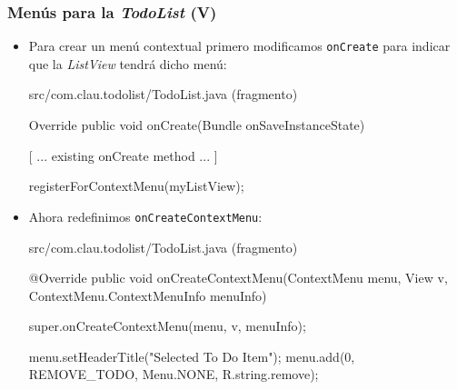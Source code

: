 \documentclass[hyperref={pdfpagelabels=true},ucs]{beamer}
\begin{document}
\begin{frame}[fragile, shrink=5]
\frametitle{Menús para la \emph{TodoList} (V)}

\begin{itemize}
\item Para crear un menú contextual primero modificamos
  \verb|onCreate| para indicar que la \emph{ListView} tendrá dicho menú:

\begin{tiny}
\begin{block}{src/com.clau.todolist/TodoList.java (fragmento)}
\begin{java}
  Override
   public void onCreate(Bundle onSaveInstanceState) {
 
  [ ... existing onCreate method ... ]

   registerForContextMenu(myListView);
}
\end{java}
\end{block}
\end{tiny}

\item Ahora redefinimos \verb|onCreateContextMenu|:

\begin{tiny}
\begin{block}{src/com.clau.todolist/TodoList.java (fragmento)}
\begin{java}
@Override
public void onCreateContextMenu(ContextMenu menu,
                                View v,
                                ContextMenu.ContextMenuInfo menuInfo) {
  super.onCreateContextMenu(menu, v, menuInfo);
 
  menu.setHeaderTitle("Selected To Do Item");
  menu.add(0, REMOVE_TODO, Menu.NONE, R.string.remove);
}
\end{java}
\end{block}
\end{tiny}


\end{itemize}


\end{frame}
\end{document}
